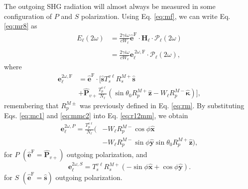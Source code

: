 \documentclass[aps,pra,10pt,amsmath,twocolumn,letterpaper]{revtex4-1}
\begin{document}
The outgoing SHG radiation will almost always be measured in some configuration
of $P$ and $S$ polarization.
Using Eq. \eqref{eq:mf}, we can write Eq. \eqref{eq:mr8} as
\begin{equation}\label{eq:r10}
\begin{split}
E_{\ell}(2\omega)
&= \frac{2\gamma i\omega}{cW_\ell}
\hat{\mathbf{e}}^{\mathrm{F}}\cdot\mathbf{H}_{\ell}\cdot
\boldsymbol{\mathcal{P}}_{\ell}(2\omega)\\\\
&= \frac{2\gamma i\omega}{cW_{v}}
\mathbf{e}^{\,2\omega,\mathrm{F}}_{\ell}\cdot
\boldsymbol{\mathcal{P}}_{\ell}(2\omega),
\end{split}
\end{equation}
where
\begin{equation}\label{eq:r12mm}
\begin{split}
\mathbf{e}^{2\omega,\mathrm{F}}_{\ell}
&= \hat{\mathbf{e}}^{\mathrm{F}}\cdot 
\Bigg[
\hat{\mathbf{s}}T_{s}^{v\ell}R^{M+}_{s}\hat{\mathbf{s}}\\
&+ \hat{\mathbf{P}}_{v+}
\frac{T^{v\ell}_{p}}
     {N_{\ell}}
\left(
\sin\theta_{0}R^{M+}_{p}\hat{\mathbf{z}}
- W_{\ell}R^{M-}_{p}\hat{\boldsymbol{\kappa}}
\right)
\Bigg],
\end{split}
\end{equation}
remembering that $R^{M\pm}_{p}$ was previously defined in Eq. \eqref{eq:rm}. By
substituting Eqs. \eqref{eq:mc1} and \eqref{eq:mmc2} into Eq.
\eqref{eq:r12mm}, we obtain
\begin{equation}\label{eq:e2wpmr}
\begin{split}
\mathbf{e}^{2\omega,P}_{\ell} =
\frac{T^{v\ell}_{p}}{N_{\ell}}
\big(
&- W_{\ell}R^{M-}_{p}\cos\phi\hat{\mathbf{x}}\\
&- W_{\ell}R^{M-}_{p}\sin\phi\hat{\mathbf{y}}
  \sin\theta_{0}R^{M+}_{p}\hat{\mathbf{z}}
\big),
\end{split}
\end{equation}
for $P$ $(\hat{\mathbf{e}}^{\mathrm{F}} = \hat{\mathbf{P}}_{v+})$ outgoing
polarization, and
\begin{equation}\label{eq:e2wsmr}
\mathbf{e}^{2\omega,S}_{\ell} =
T_{s}^{v\ell}R^{M+}_{s}
\left(
- \sin\phi\hat{\mathbf{x}}
+ \cos\phi\hat{\mathbf{y}}
\right).
\end{equation}
for $S$ $(\hat{\mathbf{e}}^{\mathrm{F}} = \hat{\mathbf{s}})$ outgoing
polarization.


\end{document}
